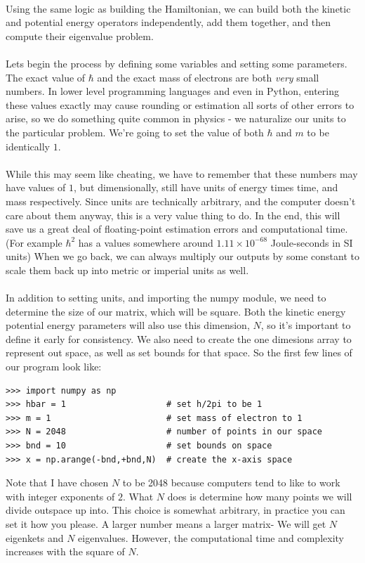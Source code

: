 \documentclass[12pt,letterpaper]{book}
\begin{document}
\paragraph*{}Using the same logic as building the Hamiltonian, we can build both the kinetic and potential energy operators independently, add them together, and then compute their eigenvalue problem.
\paragraph*{}Lets begin the process by defining some variables and setting some parameters. The exact value of $\hbar$ and the exact mass of electrons are both \textit{very} small numbers. In lower level programming languages and even in Python, entering these values exactly may cause rounding or estimation all sorts of other errors to arise, so we do something quite common in physics - we naturalize our units to the particular problem. We're going to set the value of both $\hbar$ and $m$ to be identically $1$.
\paragraph*{}While this may seem like cheating, we have to remember that these numbers may have values of $1$, but dimensionally, still have units of energy times time, and mass respectively. Since units are technically arbitrary, and the computer doesn't care about them anyway, this is a very value thing to do. In the end, this will save us a great deal of floating-point estimation errors and computational time. (For example $\hbar^2$ has a values somewhere around $1.11 \times 10^{-68}$ Joule-seconds in SI units) When we go back, we can always multiply our outputs by some constant to scale them back up into metric or imperial units as well.
\paragraph*{}In addition to setting units, and importing the numpy module, we need to determine the size of our matrix, which will be square. Both the kinetic energy potential energy parameters will also use this dimension, $N$, so it's important to define it early for consistency. We also need to create the one dimesions array to represent out space, as well as set bounds for that space.  So the first few lines of our program look like:
\begin{verbatim}
>>> import numpy as np
>>> hbar = 1                    # set h/2pi to be 1
>>> m = 1                       # set mass of electron to 1
>>> N = 2048                    # number of points in our space
>>> bnd = 10                    # set bounds on space
>>> x = np.arange(-bnd,+bnd,N)  # create the x-axis space
\end{verbatim}
Note that I have chosen $N$ to be 2048 because computers tend to like to work with integer exponents of $2$. What $N$ does is determine how many points we will divide outspace up into. This choice is somewhat arbitrary, in practice you can set it how you please. A larger number means a larger matrix- We will get $N$ eigenkets and $N$ eigenvalues. However, the computational time and complexity increases with the square of $N$.
\end{document}

